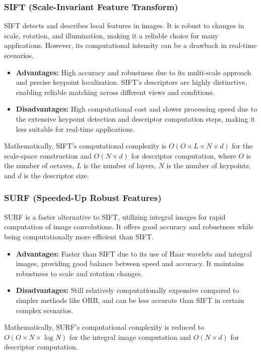 \subsubsection{SIFT (Scale-Invariant Feature Transform)}
SIFT detects and describes local features in images. It is robust to changes in scale, rotation, and illumination, making it a reliable choice for many applications. However, its computational intensity can be a drawback in real-time scenarios.
\begin{itemize}
    \item \textbf{Advantages:} High accuracy and robustness due to its multi-scale approach and precise keypoint localization. SIFT's descriptors are highly distinctive, enabling reliable matching across different views and conditions.
    \item \textbf{Disadvantages:} High computational cost and slower processing speed due to the extensive keypoint detection and descriptor computation steps, making it less suitable for real-time applications.
\end{itemize}

Mathematically, SIFT's computational complexity is $O(O \times L \times N \times d)$ for the scale-space construction and $O(N \times d)$ for descriptor computation, where $O$ is the number of octaves, $L$ is the number of layers, $N$ is the number of keypoints, and $d$ is the descriptor size.

\subsubsection{SURF (Speeded-Up Robust Features)}
SURF is a faster alternative to SIFT, utilizing integral images for rapid computation of image convolutions. It offers good accuracy and robustness while being computationally more efficient than SIFT.
\begin{itemize}
    \item \textbf{Advantages:} Faster than SIFT due to its use of Haar wavelets and integral images, providing good balance between speed and accuracy. It maintains robustness to scale and rotation changes.
    \item \textbf{Disadvantages:} Still relatively computationally expensive compared to simpler methods like ORB, and can be less accurate than SIFT in certain complex scenarios.
\end{itemize}

Mathematically, SURF's computational complexity is reduced to $O(O \times N \times \log N)$ for the integral image computation and $O(N \times d)$ for descriptor computation.

